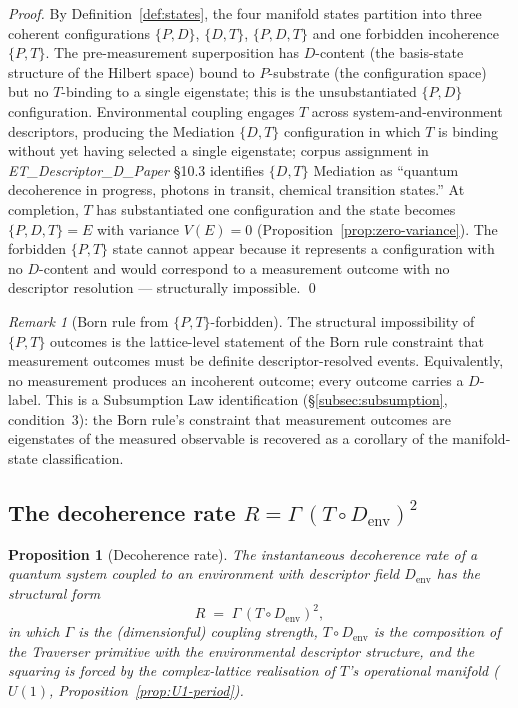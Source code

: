 \documentclass[11pt,a4paper]{article}
\newtheorem{proposition}[theorem]{Proposition}
\theoremstyle{definition}
\theoremstyle{remark}
\newtheorem{remark}[theorem]{Remark}
\begin{document}
\begin{proof}
By Definition~\ref{def:states}, the four manifold states partition into three coherent configurations $\{P,D\}$, $\{D,T\}$, $\{P,D,T\}$ and one forbidden incoherence $\{P,T\}$. The pre-measurement superposition has $D$-content (the basis-state structure of the Hilbert space) bound to $P$-substrate (the configuration space) but no $T$-binding to a single eigenstate; this is the unsubstantiated $\{P,D\}$ configuration. Environmental coupling engages $T$ across system-and-environment descriptors, producing the Mediation $\{D,T\}$ configuration in which $T$ is binding without yet having selected a single eigenstate; corpus assignment in \textit{ET\_Descriptor\_D\_Paper} \S10.3 identifies $\{D,T\}$ Mediation as ``quantum decoherence in progress, photons in transit, chemical transition states.'' At completion, $T$ has substantiated one configuration and the state becomes $\{P,D,T\} = E$ with variance $V(E)=0$ (Proposition~\ref{prop:zero-variance}). The forbidden $\{P,T\}$ state cannot appear because it represents a configuration with no $D$-content and would correspond to a measurement outcome with no descriptor resolution --- structurally impossible. \qed
\end{proof}

\begin{remark}[Born rule from $\{P,T\}$-forbidden]\label{rem:born-rule}
The structural impossibility of $\{P,T\}$ outcomes is the lattice-level statement of the Born rule constraint that measurement outcomes must be definite descriptor-resolved events. Equivalently, no measurement produces an incoherent outcome; every outcome carries a $D$-label. This is a Subsumption Law identification (\S\ref{subsec:subsumption}, condition~3): the Born rule's constraint that measurement outcomes are eigenstates of the measured observable is recovered as a corollary of the manifold-state classification.
\end{remark}

\subsection{The decoherence rate \texorpdfstring{$R = \Gamma\,(T \circ D_{\mathrm{env}})^{2}$}{R = Gamma (T comp Denv)^2}}\label{subsec:decoherence-rate}

\begin{proposition}[Decoherence rate]\label{prop:decoherence-rate}
The instantaneous decoherence rate of a quantum system coupled to an environment with descriptor field $D_{\mathrm{env}}$ has the structural form
\begin{equation}\label{eq:decoherence-rate}
R \;=\; \Gamma\,(T \circ D_{\mathrm{env}})^{2},
\end{equation}
in which $\Gamma$ is the (dimensionful) coupling strength, $T \circ D_{\mathrm{env}}$ is the composition of the Traverser primitive with the environmental descriptor structure, and the squaring is forced by the complex-lattice realisation of $T$'s operational manifold ($U(1)$, Proposition~\ref{prop:U1-period}).
\end{proposition}
\end{document}
